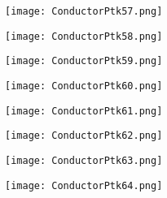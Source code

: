 \documentclass[pdf]{beamer}
\begin{document}
\begin{frame}
\begin{figure}[!h]
\centering
\texttt{[image: ConductorPtk57.png]}
\end{figure}
\end{frame}

\begin{frame}
\begin{figure}[!h]
\centering
\texttt{[image: ConductorPtk58.png]}
\end{figure}
\end{frame}

\begin{frame}
\begin{figure}[!h]
\centering
\texttt{[image: ConductorPtk59.png]}
\end{figure}
\end{frame}

\begin{frame}
\begin{figure}[!h]
\centering
\texttt{[image: ConductorPtk60.png]}
\end{figure}
\end{frame}

\begin{frame}
\begin{figure}[!h]
\centering
\texttt{[image: ConductorPtk61.png]}
\end{figure}
\end{frame}

\begin{frame}
\begin{figure}[!h]
\centering
\texttt{[image: ConductorPtk62.png]}
\end{figure}
\end{frame}

\begin{frame}
\begin{figure}[!h]
\centering
\texttt{[image: ConductorPtk63.png]}
\end{figure}
\end{frame}

\begin{frame}
\begin{figure}[!h]
\centering
\texttt{[image: ConductorPtk64.png]}
\end{figure}
\end{frame}
\end{document}

